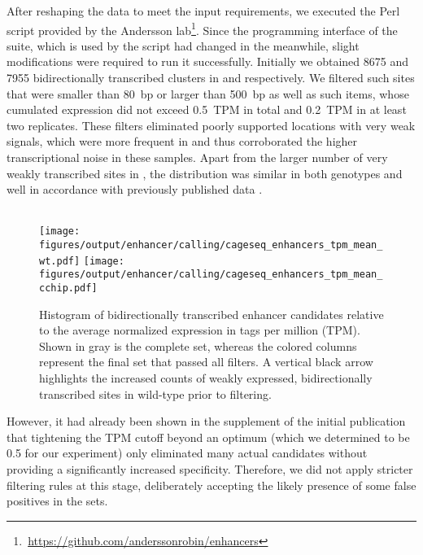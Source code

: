 After reshaping the data to meet the input requirements, we executed the Perl script provided by the Andersson lab\footnote{\,\url{https://github.com/anderssonrobin/enhancers}}. Since the programming interface of the  suite\cite{Quinlan2010}, which is used by the script had changed in the meanwhile, slight modifications were required to run it successfully. Initially we obtained \num{8675} and \num{7955} bidirectionally transcribed clusters in \dnmtwt and \dnmtchip respectively. We filtered such sites that were smaller than \SI{80}{bp} or larger than \SI{500}{bp} as well as such items, whose cumulated expression did not exceed \SI{0.5}{TPM} in total and \SI{0.2}{TPM} in at least two replicates. These filters eliminated poorly supported locations with very weak signals, which were more frequent in \dnmtwt and thus corroborated the higher transcriptional noise in these samples. Apart from the larger number of very weakly transcribed sites in \dnmtwt, the distribution was similar in both genotypes  and well in accordance with previously published data \cite{Andersson2014}. 

\begin{figure}[!htb]
	{\Large \hfill \dnmtwt \hfill \hspace{2cm} \dnmtchip \hfill} \\
	\centering
	\texttt{[image: figures/output/enhancer/calling/cageseq\_enhancers\_tpm\_mean\_wt.pdf]} 
	\texttt{[image: figures/output/enhancer/calling/cageseq\_enhancers\_tpm\_mean\_cchip.pdf]} 
	\caption{Histogram of bidirectionally transcribed enhancer candidates relative to the average normalized expression in tags per million (TPM). Shown in gray is the complete set, whereas the colored columns represent the final set that passed all filters. A vertical black arrow highlights the increased counts of weakly expressed, bidirectionally transcribed sites in wild-type prior to filtering.}
	\label{fig:enhancers:cageseqtpmean}
\end{figure}

However, it had already been shown in the supplement of the initial publication\cite{Andersson2014} that tightening the TPM cutoff beyond an optimum (which we determined to be \num{0.5} for our experiment) only eliminated many actual candidates without providing a significantly increased specificity. Therefore, we did not apply stricter filtering rules at this stage, deliberately accepting the likely presence of some false positives in the sets.
 
